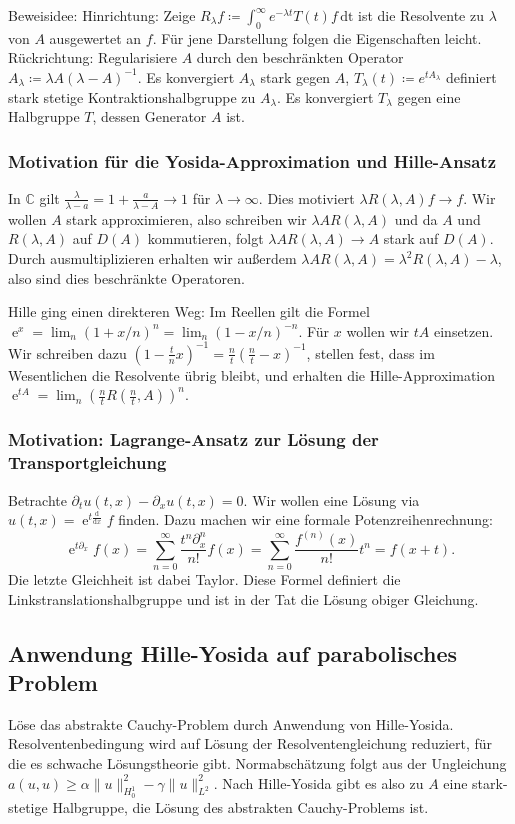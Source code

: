 \documentclass[11pt,a4paper]{scrartcl}
\newcommand{\C}{\mathbb{C}} %
\newcommand{\dd}{\frac{\mathrm{d}}{\mathrm{d}x}}
\theoremstyle{plain}
\theoremstyle{definition}
\theoremstyle{remark}
\DeclareMathOperator{\e}{e}
\begin{document}
Beweisidee: Hinrichtung: Zeige $R_\lambda f\coloneqq \int_{0}^{\infty} e^{-\lambda t}T(t)f \, \mathrm{dt}$ ist die Resolvente zu $\lambda$ von $A$ ausgewertet an $f$. Für jene Darstellung folgen die Eigenschaften leicht. Rückrichtung: Regularisiere $A$ durch den beschränkten Operator $A_\lambda \coloneqq \lambda A (\lambda-A)^{-1}$. Es konvergiert $A_\lambda$ stark gegen $A$, $T_\lambda(t) \coloneqq e^{tA_\lambda}$ definiert stark stetige Kontraktionshalbgruppe zu $A_\lambda$. Es konvergiert $T_\lambda$ gegen eine Halbgruppe $T$, dessen Generator $A$ ist.

\subsubsection{Motivation für die Yosida-Approximation und Hille-Ansatz}

In $\C$ gilt $\frac{\lambda}{\lambda-a}=1+\frac{a}{\lambda-A}\to 1$ für $\lambda\to\infty$. Dies motiviert $\lambda R(\lambda,A)f\to f$. Wir wollen $A$ stark approximieren, also schreiben wir $\lambda AR(\lambda,A)$ und da $A$ und $R(\lambda,A)$ auf $D(A)$ kommutieren, folgt $\lambda AR(\lambda,A)\to A$ stark auf $D(A)$. Durch ausmultiplizieren erhalten wir außerdem $\lambda AR(\lambda,A)=\lambda^2R(\lambda,A)-\lambda$, also sind dies beschränkte Operatoren.

Hille ging einen direkteren Weg: Im Reellen gilt die Formel $\e^x=\lim_n (1+x/n)^n=\lim_n (1-x/n)^{-n}$. Für $x$ wollen wir $tA$ einsetzen. Wir schreiben dazu $(1-\frac{t}{n}x)^{-1}=\frac{n}{t}(\frac{n}{t}-x)^{-1}$, stellen fest, dass im Wesentlichen die Resolvente übrig bleibt, und erhalten die Hille-Approximation $\e^{tA}=\lim_n (\frac{n}{t}R(\frac{n}{t},A))^n$.

\subsubsection{Motivation: Lagrange-Ansatz zur Lösung der Transportgleichung}

Betrachte $\partial_t u(t,x)-\partial_x u(t,x)=0$. Wir wollen eine Lösung via $u(t,x)=\e^{t\dd}f$ finden. Dazu machen wir eine formale Potenzreihenrechnung: $$\e^{t\partial_x}f(x)=\sum_{n=0}^\infty \frac{t^n\partial_x^n}{n!}f(x)=\sum_{n=0}^\infty \frac{f^{(n)}(x)}{n!}t^n=f(x+t).$$ Die letzte Gleichheit ist dabei Taylor. Diese Formel definiert die Linkstranslationshalbgruppe und ist in der Tat die Lösung obiger Gleichung.

\subsection{Anwendung Hille-Yosida auf parabolisches Problem}

Löse das abstrakte Cauchy-Problem durch Anwendung von Hille-Yosida. Resolventenbedingung wird auf Lösung der Resolventengleichung reduziert, für die es schwache Lösungstheorie gibt. Normabschätzung folgt aus der Ungleichung $a(u,u) \geq \alpha \|u\|_{H^1_0}^2 - \gamma \|u\|_{L^2}^2$. Nach Hille-Yosida gibt es also zu $A$ eine stark-stetige Halbgruppe, die Lösung des abstrakten Cauchy-Problems ist.
\end{document}
